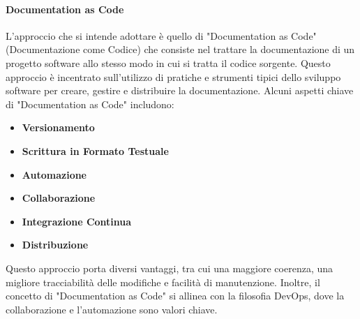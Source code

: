 \documentclass{article}
\begin{document}

\paragraph{Documentation as Code}\label{sec:DocumentationAscode}
L'approccio che si intende adottare è quello di "Documentation as Code" (Documentazione come Codice) che consiste nel trattare la documentazione di un progetto software allo stesso modo in cui si tratta il codice sorgente. Questo approccio è incentrato sull'utilizzo di pratiche e strumenti tipici dello sviluppo software per creare, gestire e distribuire la documentazione.
Alcuni aspetti chiave di "Documentation as Code" includono:
\begin{itemize}
    \item \textbf{Versionamento}
    \item \textbf{Scrittura in Formato Testuale}
    \item \textbf{Automazione}
    \item \textbf{Collaborazione}
    \item \textbf{Integrazione Continua}
    \item \textbf{Distribuzione}
\end{itemize}
Questo approccio porta diversi vantaggi, tra cui una maggiore coerenza, una migliore tracciabilità delle modifiche e facilità di manutenzione. Inoltre, il concetto di "Documentation as Code" si allinea con la filosofia DevOps, dove la collaborazione e l'automazione sono valori chiave.\\
\end{document}
